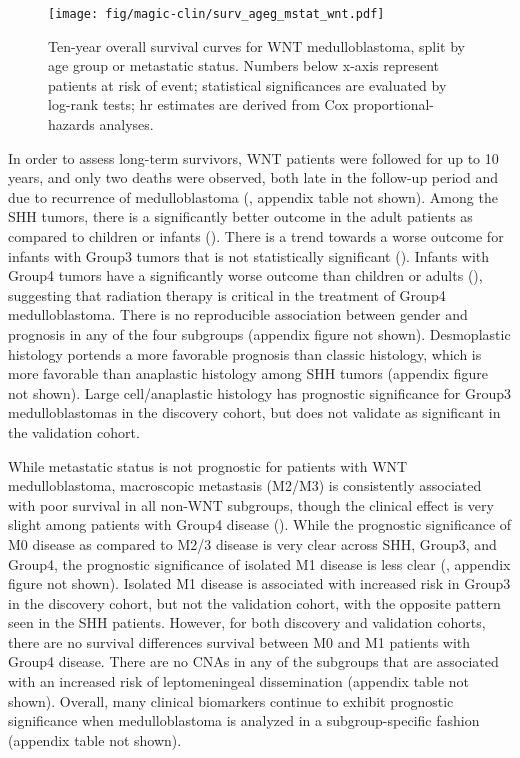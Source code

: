 \begin{figure}[h]
	\begin{center}
		\texttt{[image: fig/magic-clin/surv\_ageg\_mstat\_wnt.pdf]}
	\end{center}
	\caption[Ten-year overall survival curves for WNT medulloblastoma]
	{
	Ten-year overall survival curves for WNT medulloblastoma, split by age group or metastatic status.
	Numbers below x-axis represent patients at risk of event; statistical significances are evaluated by log-rank tests; \gls{hr} estimates are derived from Cox proportional-hazards analyses.
	}
	\label{fig:surv_ageg_mstat_wnt}
\end{figure}

In order to assess long-term survivors, WNT patients were followed for up to 10 years, and only two deaths were observed, both late in the follow-up period and due to recurrence of medulloblastoma (, appendix table not shown).  Among the SHH tumors, there is a significantly better outcome in the adult patients as compared to children or infants ().  There is a trend towards a worse outcome for infants with Group3 tumors that is not statistically significant ().  Infants with Group4 tumors have a significantly worse outcome than children or adults (), suggesting that radiation therapy is critical in the treatment of Group4 medulloblastoma. There is no reproducible association between gender and prognosis in any of the four subgroups (appendix figure not shown). Desmoplastic histology portends a more favorable prognosis than classic histology, which is more favorable than anaplastic histology among SHH tumors (appendix figure not shown). Large cell/anaplastic histology has prognostic significance for Group3 medulloblastomas in the discovery cohort, but does not validate as significant in the validation cohort.

While metastatic status is not prognostic for patients with WNT medulloblastoma, macroscopic metastasis (M2/M3) is consistently associated with poor survival in all non-WNT subgroups, though the clinical effect is very slight among patients with Group4 disease ().  While the prognostic significance of M0 disease as compared to M2/3 disease is very clear across SHH, Group3, and Group4, the prognostic significance of isolated M1 disease is less clear (, appendix figure not shown). Isolated M1 disease is associated with increased risk in Group3 in the discovery cohort, but not the validation cohort, with the opposite pattern seen in the SHH patients. However, for both discovery and validation cohorts, there are no survival differences survival between M0 and M1 patients with Group4 disease. There are no CNAs in any of the subgroups that are associated with an increased risk of leptomeningeal dissemination (appendix table not shown). Overall, many clinical biomarkers continue to exhibit prognostic significance when medulloblastoma is analyzed in a subgroup-specific fashion (appendix table not shown).

